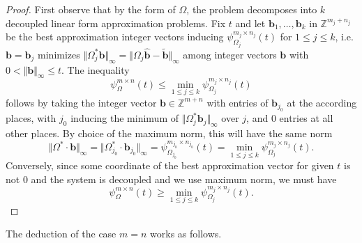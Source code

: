 \documentclass[10pt]{amsart}
\theoremstyle{definition}
\newcommand{\bb}{\boldsymbol{b}}
\newcommand{\Z}{\mathbb{Z}}
\begin{document}
\begin{proof}
    First observe that by the form of $\Omega$, the problem
    decomposes into $k$ decoupled linear form approximation problems.
    Fix $t$ and let $\bb_1,\ldots,\bb_k$ in $\Z^{m_j+n_j}$ be the best approximation integer vectors 
    inducing $\psi_{\Omega_j}^{m_{j}\times n_{j}}(t)$ for $1\le j\le k$, i.e. $\bb=\bb_j$
    minimizes $\Vert\Omega_j^{\ast} \bb\Vert_{\infty}=\Vert\Omega_j  \hat{\bb}-\tilde{\bb}\Vert_{\infty}$ among integer vectors $\bb$ with $0<\Vert \bb\Vert_{\infty}\le t$.
    The inequality
    \[
    \psi_{\Omega}^{m\times n}(t) \le \min_{1\le j\le k} \psi_{\Omega_j}^{m_j\times n_j}(t)
    \]
    follows by taking the
    integer vector $\bb\in \Z^{m+n}$ with entries of $\bb_{j_0}$ at the according places, with $j_0$
    inducing the minimum of $\Vert\Omega_j^{\ast} \bb_j\Vert_{\infty}$ over $j$, and $0$ entries at all other places. By choice of the maximum norm, this will have the same norm 
    \[
    \Vert \Omega^{\ast}\cdot \bb\Vert_{\infty} = 
    \Vert\Omega_{j_0}^{\ast}\cdot \bb_{j_{0}}\Vert_{\infty} 
    =\psi_{\Omega_{j_0}}^{m_{j_0}\times n_{j_0}}(t)
    = \min_{1\le j\le k} \psi_{\Omega_j}^{m_j\times n_j}(t).
    \]
    Conversely, since some coordinate of the best approximation vector for given $t$ is not $0$ and the system is decoupled and we use maximum norm,
    we must have 
    \[
    \psi_{\Omega}^{m\times n}(t) \ge \min_{1\le j\le k} \psi_{\Omega_j}^{m_j\times n_j}(t).
    \]
\end{proof}

The deduction of the case $m=n$ works as follows.
\end{document}
